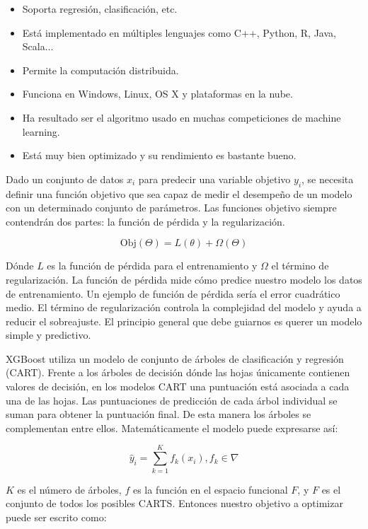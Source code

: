 \documentclass[11pt,a4paper,spanish]{article} %
\begin{document}
\begin{itemize}
	\item{Soporta regresión, clasificación, etc.}
	
	\item{Está implementado en múltiples lenguajes como C++, Python, R, Java, Scala...}
	
	\item{Permite la computación distribuida.}
	
	\item{Funciona en Windows, Linux, OS X y plataformas en la nube.}

	\item{Ha resultado ser el algoritmo usado en muchas competiciones de machine learning.}
	
	\item{Está muy bien optimizado y su rendimiento es bastante bueno.}
	
\end{itemize}

Dado un conjunto de datos $x_i$ para predecir una variable objetivo $y_i$, se necesita definir una función objetivo que sea capaz de medir el desempeño de un modelo con un determinado conjunto de parámetros. Las funciones objetivo siempre contendrán dos partes: la función de pérdida y la regularización.

$$\mbox{Obj}(\Theta) = L(\theta)+\Omega(\Theta)$$

Dónde $L$ es la función de pérdida para el entrenamiento y $\Omega$ el término de regularización. La función de pérdida mide cómo predice nuestro modelo los datos de entrenamiento. Un ejemplo de función de pérdida sería el error cuadrático medio. El término de regularización controla la complejidad del modelo y ayuda a reducir el sobreajuste. El principio general que debe guiarnos es querer un modelo simple y predictivo. 

XGBoost utiliza un modelo de conjunto de árboles de clasificación y regresión (CART). Frente a los árboles de decisión dónde las hojas únicamente contienen valores de decisión, en los modelos CART una puntuación está asociada a cada una de las hojas. Las puntuaciones de predicción de cada árbol individual se suman para obtener la puntuación final. De esta manera los árboles se complementan entre ellos. Matemáticamente el modelo puede expresarse así:

$$\hat{y}_i = \sum_{k=1}^K f_k(x_i), f_k \in \nabla$$

$K$ es el número de árboles, $f$ es la función en el espacio funcional $F$, y $F$ es el conjunto de todos los posibles CARTS. Entonces nuestro objetivo a optimizar puede ser escrito como:
\end{document}

